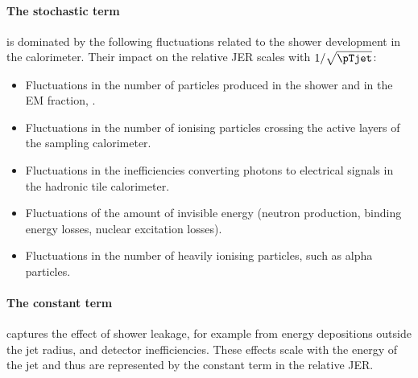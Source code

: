 \paragraph{The stochastic term} is dominated by the following fluctuations related to the shower development in the calorimeter. Their impact on the relative JER scales with $1 / \sqrt{\pTjet}$:
\begin{itemize}
    \item Fluctuations in the number of particles produced in the shower and in the EM fraction, \fEM.
    \item Fluctuations in the number of ionising particles crossing the active layers of the sampling calorimeter.
    \item Fluctuations in the inefficiencies converting photons to electrical signals in the hadronic tile calorimeter.
    \item Fluctuations of the amount of invisible energy (neutron production, binding energy losses, nuclear excitation losses).
    \item Fluctuations in the number of heavily ionising particles, such as alpha particles.
\end{itemize}

\paragraph{The constant term} captures the effect of shower leakage, for example from energy depositions outside the jet radius, and detector inefficiencies. These effects scale with the energy of the jet and thus are represented by the constant term in the relative JER.

